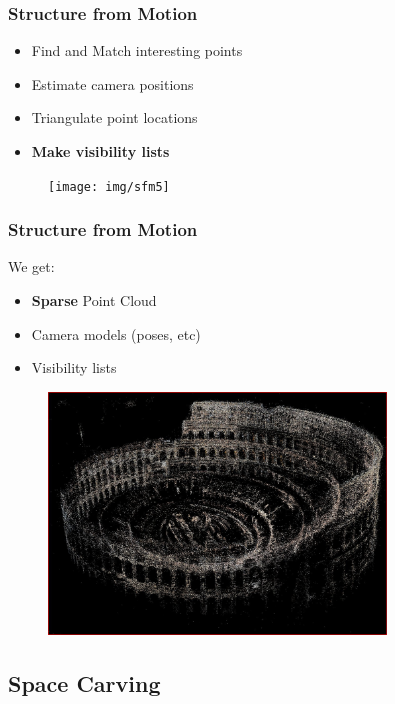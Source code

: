 \documentclass{beamer}
\begin{document}
\begin{frame}
  \frametitle{Structure from Motion}
  \begin{itemize}
    \item Find and Match interesting points
    \item Estimate camera positions
    \item Triangulate point locations
    \item \textbf{Make visibility lists}
  \end{itemize}
  \begin{figure}[htb!]
   \centering
   \texttt{[image: img/sfm5]}
  \end{figure}
\end{frame}

\begin{frame}
  \frametitle{Structure from Motion}
  We get:
  \begin{itemize}
    \item \textbf{Sparse} Point Cloud
    \item Camera models (poses, etc)
    \item Visibility lists
  \end{itemize}
  \begin{figure}[htb!]
   \centering
   \includegraphics[width=0.8\textwidth]{img/sfm_sparsepointcloud}
  \end{figure}
\end{frame}


\subsection{Space Carving}
\end{document}
